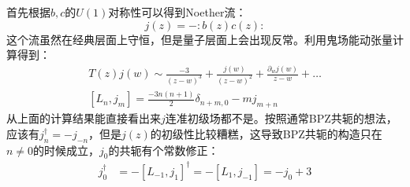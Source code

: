首先根据$b,c$的$U(1)$对称性可以得到Noether流：
\begin{equation}
	j(z)=-:b(z)c(z):
\end{equation}
这个流虽然在经典层面上守恒，但是量子层面上会出现反常。利用鬼场能动张量计算得到：
\begin{equation}
	\begin{gathered}
		T(z)j(w)\sim\frac{-3}{(z-w)^3}+\frac{j(w)}{(z-w)^2}+\frac{\partial_wj(w)}{z-w}+\ldots \\
		[L_n,j_m]=\frac{-3n(n+1)}2\delta_{n+m,0}-mj_{m+n}
	\end{gathered}
\end{equation}
从上面的计算结果能直接看出来$j$连准初级场都不是。按照通常BPZ共轭的想法，应该有$j_n^\dagger=-j_{-n}$，但是$j(z)$的初级性比较糟糕，这导致BPZ共轭的构造只在$n\neq 0$的时候成立，$j_0$的共轭有个常数修正：
\begin{equation}
	\begin{aligned}j_0^\dagger&=-[L_{-1},j_1]^\dagger=-[L_1,j_{-1}]=-j_0+3\end{aligned}
\end{equation}

